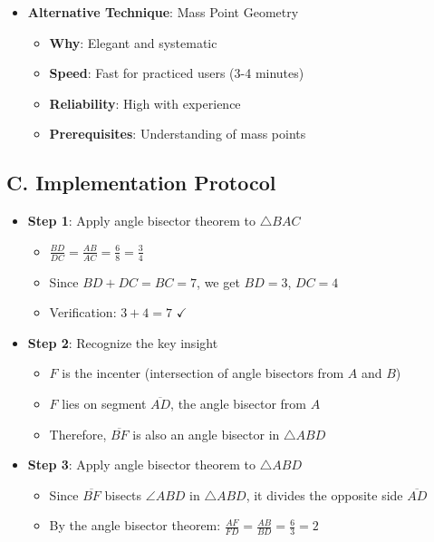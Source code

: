 \documentclass[12pt]{article}
\begin{document}
\begin{conversionbox}
\begin{itemize}[leftmargin=*]
    \item \textbf{Alternative Technique}: Mass Point Geometry
    \begin{itemize}
        \item \textbf{Why}: Elegant and systematic
        \item \textbf{Speed}: Fast for practiced users (3-4 minutes)
        \item \textbf{Reliability}: High with experience
        \item \textbf{Prerequisites}: Understanding of mass points
    \end{itemize}
\end{itemize}

\subsection*{C. Implementation Protocol}
\begin{itemize}[leftmargin=*]
    \item \textbf{Step 1}: Apply angle bisector theorem to $\triangle BAC$
    \begin{itemize}
        \item $\frac{BD}{DC} = \frac{AB}{AC} = \frac{6}{8} = \frac{3}{4}$
        \item Since $BD + DC = BC = 7$, we get $BD = 3$, $DC = 4$
        \item Verification: $3 + 4 = 7$ $\checkmark$
    \end{itemize}
    
    \item \textbf{Step 2}: Recognize the key insight
    \begin{itemize}
        \item $F$ is the incenter (intersection of angle bisectors from $A$ and $B$)
        \item $F$ lies on segment $\overline{AD}$, the angle bisector from $A$
        \item Therefore, $\overline{BF}$ is also an angle bisector in $\triangle ABD$
    \end{itemize}
    
    \item \textbf{Step 3}: Apply angle bisector theorem to $\triangle ABD$
    \begin{itemize}
        \item Since $\overline{BF}$ bisects $\angle ABD$ in $\triangle ABD$, it divides the opposite side $\overline{AD}$
        \item By the angle bisector theorem: $\frac{AF}{FD} = \frac{AB}{BD} = \frac{6}{3} = 2$
    \end{itemize}
    

\end{itemize}
\end{conversionbox}
\end{document}
